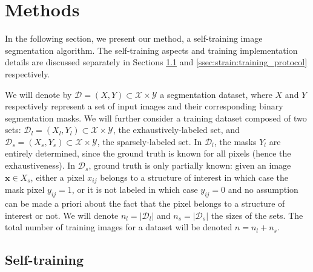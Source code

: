 \section{Methods}
\label{sec:strain:methods}

In the following section, we present our method, a self-training image segmentation algorithm. The self-training aspects and training implementation details are discussed separately in Sections \ref{ssec:strain:self_training} and \ref{ssec:strain:training_protocol} respectively.

We will denote by  $\mathcal{D} = \left(X, Y\right) \subset \mathcal{X} \times \mathcal{Y}$ a segmentation dataset, where $X$ and $Y$ respectively represent a set of input images and their corresponding binary segmentation masks. We will further consider a training dataset composed of two sets: $\mathcal{D}_l = \left(X_l, Y_l\right) \subset \mathcal{X} \times \mathcal{Y}$, the exhaustively-labeled set, and $\mathcal{D}_s = \left(X_s, Y_s\right) \subset \mathcal{X} \times \mathcal{Y}$, the sparsely-labeled set. In $\mathcal{D}_l$, the masks $Y_l$ are entirely determined, since the ground truth is known for all pixels (hence the exhaustiveness). In $\mathcal{D}_s$, ground truth is only partially known: given an image $\mathbf{x} \in X_s$, either a pixel $x_{ij}$ belongs to a structure of interest in which case the mask pixel $y_{ij} = 1$, or it is not labeled in which case $y_{ij} = 0$ and no assumption can be made a priori about the fact that the pixel belongs to a structure of interest or not. We will denote $n_l = |\mathcal{D}_l|$ and $n_s = |\mathcal{D}_s|$ the sizes of the sets. The total number of training images for a dataset will be denoted $n = n_l + n_s$.


\subsection{Self-training}
\label{ssec:strain:self_training}
 
